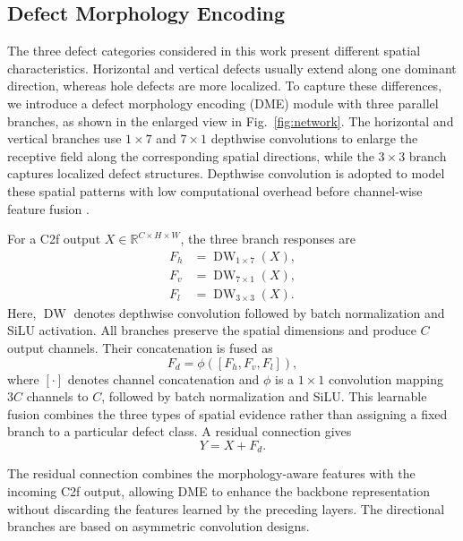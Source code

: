 \documentclass[journal]{IEEEtran}
\begin{document}
\subsection{Defect Morphology Encoding}
The three defect categories considered in this work present different spatial characteristics. Horizontal and vertical defects usually extend along one dominant direction, whereas hole defects are more localized. To capture these differences, we introduce a defect morphology encoding (DME) module with three parallel branches, as shown in the enlarged view in Fig.~\ref{fig:network}. The horizontal and vertical branches use $1\times7$ and $7\times1$ depthwise convolutions to enlarge the receptive field along the corresponding spatial directions, while the $3\times3$ branch captures localized defect structures. Depthwise convolution is adopted to model these spatial patterns with low computational overhead before channel-wise feature fusion \cite{howard2017mobilenets}.

For a C2f output $X\in\mathbb{R}^{C\times H\times W}$, the three branch responses are
\begin{align}
F_h &= \operatorname{DW}_{1\times7}(X), \label{eq:dme-horizontal}\\
F_v &= \operatorname{DW}_{7\times1}(X), \label{eq:dme-vertical}\\
F_l &= \operatorname{DW}_{3\times3}(X). \label{eq:dme-local}
\end{align}
Here, $\operatorname{DW}$ denotes depthwise convolution followed by batch normalization and SiLU activation. All branches preserve the spatial dimensions and produce $C$ output channels. Their concatenation is fused as
\begin{equation}
F_d=\phi\left([F_h,F_v,F_l]\right),
\label{eq:dme-fusion}
\end{equation}
where $[\cdot]$ denotes channel concatenation and $\phi$ is a $1\times1$ convolution mapping $3C$ channels to $C$, followed by batch normalization and SiLU. This learnable fusion combines the three types of spatial evidence rather than assigning a fixed branch to a particular defect class. A residual connection \cite{he2016resnet} gives
\begin{equation}
Y=X+F_d.
\label{eq:dme-residual}
\end{equation}

The residual connection combines the morphology-aware features with the incoming C2f output, allowing DME to enhance the backbone representation without discarding the features learned by the preceding layers. The directional branches are based on asymmetric convolution designs\cite{ding2019acnet}.
\end{document}
